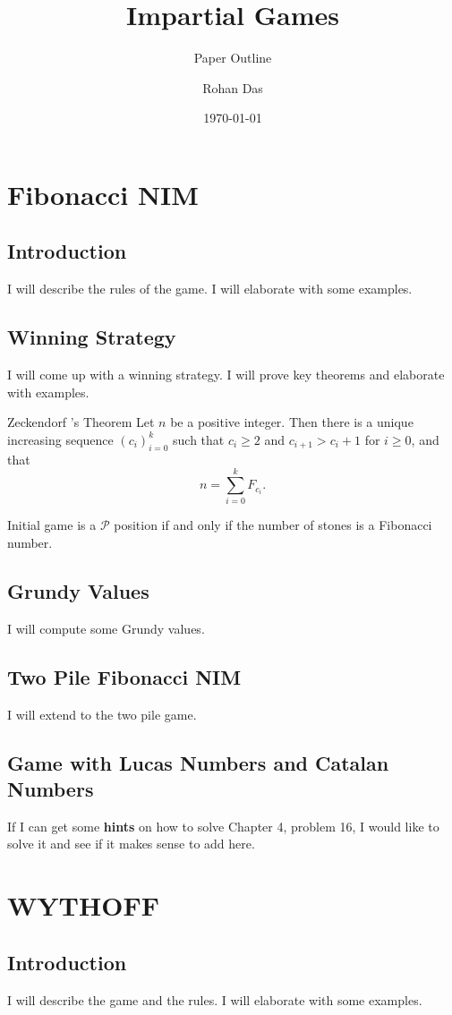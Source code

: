 \documentclass[11pt,twoside]{scrartcl}
\title{Impartial Games}
\subtitle{Paper Outline}
\author{Rohan Das}
\date{\today}
\newcommand{\mcP}{\mathcal{P}}
\begin{document}
\maketitle
\section{Fibonacci NIM}
\subsection{Introduction}
I will describe the rules of the game. I will elaborate with some examples.
\subsection{Winning Strategy}
I will come up with a winning strategy. I will prove key theorems and elaborate with examples.
\begin{theorem}{Zeckendorf ’s Theorem}
    Let $n$ be a positive integer. Then there is a unique increasing sequence $(c_i)_{i=0}^k$ such that $c_i \ge 2$ and $c_{i+1} > c_i + 1$ for $i \ge 0$, and that
    \[n = \sum_{i=0}^k F_{c_i}.\]
\end{theorem}

\begin{theorem}
    Initial game is a $\mcP$ position if and only if the number of stones is a Fibonacci number.
\end{theorem}
\subsection{Grundy Values}
I will compute some Grundy values.

\subsection{Two Pile Fibonacci NIM}
I will extend to the two pile game.

\subsection{Game with Lucas Numbers and Catalan Numbers}
If I can get some \textbf{hints} on how to solve Chapter 4, problem 16, I would like to solve it and see if it makes sense to add here.

\section{WYTHOFF}
\subsection{Introduction}
I will describe the game and the rules. I will elaborate with some examples.
\end{document}
